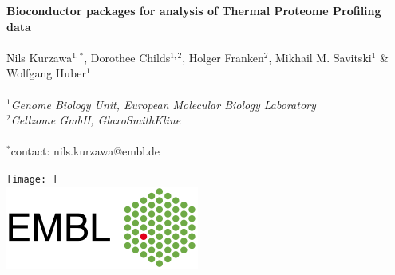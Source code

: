 \documentclass{article}
\title{}
\author{}
\date{}
\begin{document}


\begin{center}
\colorbox{lgray}{
  \begin{minipage}{.865\textwidth}
      \vspace{0.4cm}
      \huge 
      \noindent
      \textbf{Bioconductor packages for analysis of Thermal Proteome Profiling data} \\
      \vspace{0.05cm} \\
      \Large Nils Kurzawa$^{1,*}$, Dorothee Childs$^{1,2}$, Holger Franken$^{2}$, Mikhail M. Savitski$^{1}$ \& Wolfgang Huber$^{1}$ \\
      \vspace{0.05cm} \\
      \Large \textit{$^1$Genome Biology Unit, European Molecular Biology Laboratory} \\
      \Large \textit{$^2$Cellzome GmbH, GlaxoSmithKline} \\
      \vspace{0.05cm} \\
      \normalsize $^*$contact: nils.kurzawa@embl.de \\
  \end{minipage}
  \begin{minipage}{3.7cm}
      \texttt{[image: ]} \\
      \vspace{0.5cm}
      \includegraphics[width=1.1\linewidth, right]{figs/embl_logo.png}
  \end{minipage}
}
\end{center}
\end{document}
